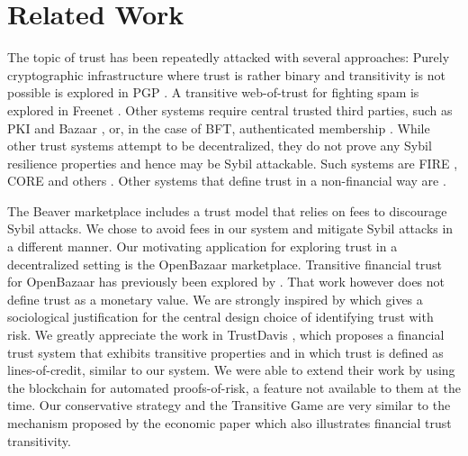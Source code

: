 \section{Related Work}
   The topic of trust has been repeatedly attacked with several approaches: Purely cryptographic infrastructure where trust
   is rather binary and transitivity is not possible is explored in PGP \cite{pgp}. A transitive web-of-trust for fighting
   spam is explored in Freenet \cite{freenet}. Other systems require central trusted
   third parties, such as PKI \cite{pki} and Bazaar \cite{bazaar}, or, in the case of BFT, authenticated membership
   \cite{byzantine}. While other trust systems attempt to be decentralized, they do not prove any Sybil resilience
   properties and hence may be Sybil attackable. Such systems are FIRE \cite{fire}, CORE \cite{core} and others
   \cite{openrep,ghkkw,rk}. Other systems that define trust in a non-financial way are
   \cite{mui,beta,pace,vpc,sdt,wot,pathfinder}.

   The Beaver marketplace \cite{beaver} includes a trust model that relies on
   fees to discourage Sybil attacks. We chose to avoid fees in our system and mitigate Sybil attacks in a different manner.
   Our motivating application for exploring trust in a decentralized setting is the OpenBazaar marketplace. Transitive
   financial trust for OpenBazaar has previously been explored by \cite{dionyziz}. That work however does not define trust
   as a monetary value. We are strongly inspired by \cite{kmrs}
   which gives a sociological justification for the central design choice of identifying trust with
   risk. We greatly appreciate the work in TrustDavis \cite{davis}, which proposes a financial trust system that exhibits
   transitive properties and in which trust is defined as lines-of-credit, similar to our system. We were able to extend
   their work by using the blockchain for automated proofs-of-risk, a feature not available to them at the time. Our
   conservative strategy and the Transitive Game are very similar to the mechanism proposed by the economic paper
   \cite{iou} which also illustrates financial trust transitivity. 

